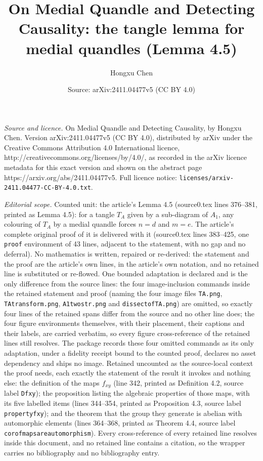 \documentclass[10pt,a4paper]{amsart}
\title[Lemma 4.5]{On Medial Quandle and Detecting Causality: the tangle lemma for medial quandles (Lemma 4.5)}
\author{Hongxu Chen}
\date{Source: arXiv:2411.04477v5 (CC BY 4.0)}
\begin{document}
\maketitle

\noindent\emph{Source and licence.} On Medial Quandle and Detecting Causality, by Hongxu Chen. Version arXiv:2411.04477v5
(CC BY 4.0), distributed by arXiv under the Creative Commons Attribution 4.0 International licence,
http://creativecommons.org/licenses/by/4.0/, as recorded in the arXiv licence metadata for this exact
version and shown on the abstract page https://arxiv.org/abs/2411.04477v5. Full licence notice:
\texttt{licenses/arxiv-2411.04477-CC-BY-4.0.txt}.\par\smallskip

\noindent\textit{Editorial scope.} Counted unit: the article's Lemma 4.5 (source0.tex lines 376--381, printed as Lemma 4.5): for a tangle $T_A$ given by a sub-diagram of $A_1$, any colouring of $T_A$ by a medial quandle forces $n=d$ and $m=e$. The article's complete original proof of it is delivered with it (source0.tex lines 383--425, one \texttt{proof} environment of 43 lines, adjacent to the statement, with no gap and no deferral). No mathematics is written, repaired or re-derived: the statement and the proof are the article's own lines, in the article's own notation, and no retained line is substituted or re-flowed. One bounded adaptation is declared and is the only difference from the source lines: the four image-inclusion commands inside the retained statement and proof (naming the four image files \texttt{TA.png}, \texttt{TAtransform.png}, \texttt{A1twostr.png} and \texttt{dissectofTA.png}) are omitted, so exactly four lines of the retained spans differ from the source and no other line does; the four figure environments themselves, with their placement, their captions and their labels, are carried verbatim, so every figure cross-reference of the retained lines still resolves. The package records these four omitted commands as its only adaptation, under a fidelity receipt bound to the counted proof, declares no asset dependency and ships no image. Retained uncounted as the source-local context the proof needs, each exactly the statement of the result it invokes and nothing else: the definition of the maps $f_{xy}$ (line 342, printed as Definition 4.2, source label \texttt{Dfxy}); the proposition listing the algebraic properties of those maps, with its five labelled items (lines 344--354, printed as Proposition 4.3, source label \texttt{propertyfxy}); and the theorem that the group they generate is abelian with automorphic elements (lines 364--368, printed as Theorem 4.4, source label \texttt{corofmapsareautomorphism}). Every cross-reference of every retained line resolves inside this document, and no retained line contains a citation, so the wrapper carries no bibliography and no bibliography entry.
\end{document}
